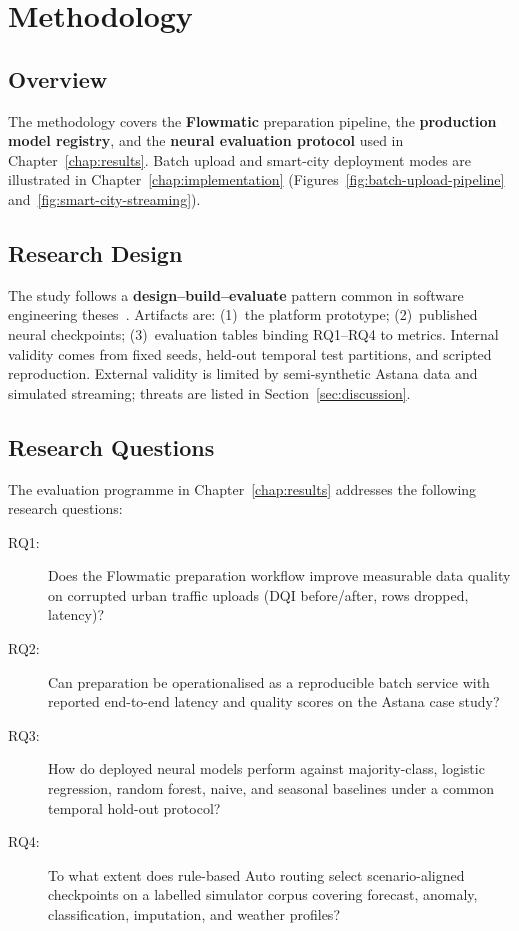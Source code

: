 %
%

\chapter{Methodology}
\label{chap:methodology}

\section{Overview}

The methodology covers the \textbf{Flowmatic} preparation pipeline, the \textbf{production model registry}, and the \textbf{neural evaluation protocol} used in Chapter~\ref{chap:results}. Batch upload and smart-city deployment modes are illustrated in Chapter~\ref{chap:implementation} (Figures~\ref{fig:batch-upload-pipeline} and~\ref{fig:smart-city-streaming}).

\section{Research Design}

The study follows a \textbf{design--build--evaluate} pattern common in software engineering theses~\cite{sculley2015hidden,kreutzberger2022mlops}. Artifacts are: (1)~the platform prototype; (2)~published neural checkpoints; (3)~evaluation tables binding RQ1--RQ4 to metrics. Internal validity comes from fixed seeds, held-out temporal test partitions, and scripted reproduction. External validity is limited by semi-synthetic Astana data and simulated streaming; threats are listed in Section~\ref{sec:discussion}.

\section{Research Questions}
\label{sec:research_questions}

The evaluation programme in Chapter~\ref{chap:results} addresses the following research questions:
\begin{description}
  \item[RQ1:] Does the Flowmatic preparation workflow improve measurable data quality on corrupted urban traffic uploads (DQI before/after, rows dropped, latency)?
  \item[RQ2:] Can preparation be operationalised as a reproducible batch service with reported end-to-end latency and quality scores on the Astana case study?
  \item[RQ3:] How do deployed neural models perform against majority-class, logistic regression, random forest, naive, and seasonal baselines under a common temporal hold-out protocol?
  \item[RQ4:] To what extent does rule-based Auto routing select scenario-aligned checkpoints on a labelled simulator corpus covering forecast, anomaly, classification, imputation, and weather profiles?
\end{description}

